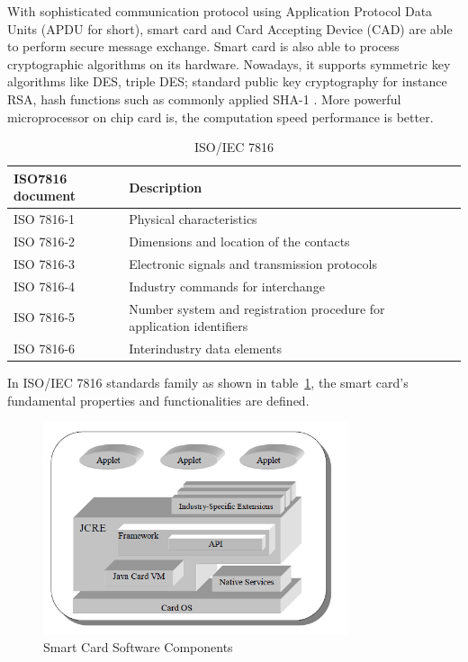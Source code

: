 With sophisticated communication protocol using Application Protocol Data Units (APDU for short), smart card and Card Accepting Device (CAD) are able to perform secure message exchange. Smart card is also able to process cryptographic algorithms on its hardware. Nowadays, it supports symmetric key algorithms like DES, triple DES; standard public key cryptography for instance RSA, hash functions such as commonly applied SHA-1 \cite{handbuch}. More powerful microprocessor on chip card is, the computation speed performance is better.  

\begin{table}[!htb]
\caption{ISO/IEC 7816 \cite{handbuch}}
\centering
\begin{tabular}{lllll}
 ISO7816 document & Description  \\[1ex]
\hline\hline
 ISO 7816-1&Physical characteristics   \\
ISO 7816-2&Dimensions and location of the contacts   \\
 ISO 7816-3& Electronic signals and transmission protocols   \\
ISO 7816-4&Industry commands for interchange  \\
ISO 7816-5& Number system and registration procedure for application identifiers \\
ISO 7816-6& Interindustry data elements  \\
\hline
\end{tabular}
\label{table:ISO7816}
\end{table}

In ISO/IEC 7816 standards family as shown in table~\ref{table:ISO7816}, the smart card's fundamental properties and functionalities are defined.

\begin{figure}[!htbp]
	\centering
	\includegraphics[width=0.8\textwidth]{scc.jpg}
		\caption{Smart Card Software Components \cite{jcadg}}
	\label{fig:scc}
\end{figure}

